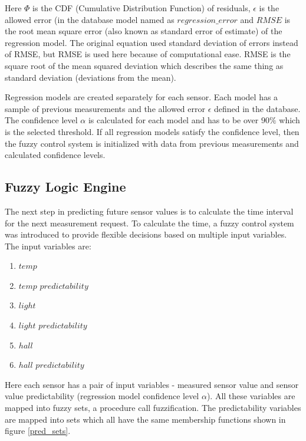 Here $\Phi$ is the CDF (Cumulative Distribution Function) of residuals, $\epsilon$ is the allowed error (in the database model named as $regression\_error$ and $RMSE$ is the root mean square error (also known as standard error of estimate) of the regression model. The original equation used standard deviation of errors instead of RMSE, but RMSE is used here because of computational ease. RMSE is the square root of the mean squared deviation \cite{RMSE} which describes the same thing as standard deviation (deviations from the mean). 

Regression models are created separately for each sensor. Each model has a sample of previous measurements and the allowed error $\epsilon$ defined in the database. 
The confidence level $\alpha$ is calculated for each model and has to be over $90\%$ which is the selected threshold. If all regression models satisfy the confidence level, then the fuzzy control system is initialized with data from previous measurements and calculated confidence levels. 

\subsection{Fuzzy Logic Engine}

The next step in predicting future sensor values is to calculate the time interval for the next measurement request. To calculate the time, a fuzzy control system was introduced to provide flexible decisions based on multiple input variables. The input variables are: 
\begin{enumerate}
\item $temp$					
\item $temp$ $predictability$	
\item $light$					
\item $light$ $predictability$	
\item $hall$					
\item $hall$ $predictability$
\end{enumerate}

Here each sensor has a pair of input variables - measured sensor value and sensor value predictability (regression model confidence level $\alpha$). All these variables are mapped into fuzzy sets, a procedure call fuzzification. The predictability variables are mapped into sets which all have the same membership functions shown in figure \autoref{pred_sets}.


